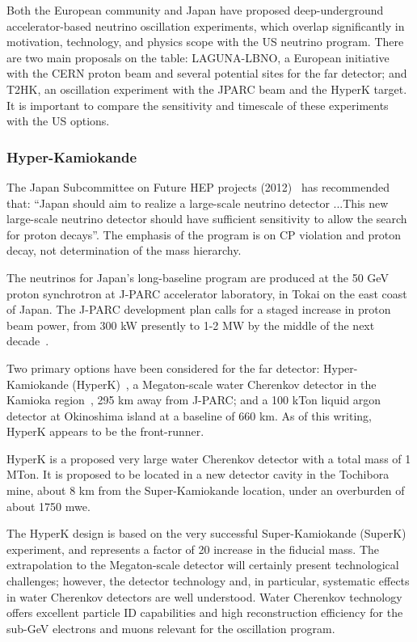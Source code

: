 Both the European community and Japan have proposed deep-underground
accelerator-based neutrino oscillation experiments, which overlap
significantly in motivation, technology, and physics scope with
the US neutrino 
program. There are two main proposals on the table: LAGUNA-LBNO,
a European initiative with the CERN proton beam and several potential
sites for the far detector; and T2HK, an oscillation experiment with
the JPARC beam and the HyperK target. It is important to compare the sensitivity and timescale of
these experiments with the US options. 

\subsubsection{Hyper-Kamiokande}

The Japan Subcommittee on Future HEP projects
(2012)~\cite{nonus:HEPfuture} has recommended 
that:
``Japan should aim to realize a large-scale neutrino detector ...This
new large-scale neutrino detector should have sufficient sensitivity
to allow the search for proton decays''. 
The emphasis of the program is on CP violation and proton decay, not
determination of the mass hierarchy.

The neutrinos for Japan's long-baseline program are produced at the
50 GeV proton synchrotron at J-PARC 
accelerator laboratory, in Tokai 
on the east coast of Japan. The J-PARC development plan calls for a
staged increase in proton beam power, from 300 kW presently to 1-2 MW
by the middle of the next decade~\cite{nonus:JapanMasterPlan}. 

Two primary options have been considered for the far detector:
Hyper-Kamiokande (HyperK)~\cite{nonus:HyperK}, a Megaton-scale water 
Cherenkov detector in the Kamioka region~\cite{nonus:HyperK}, 295 km
away from J-PARC; and a 100 kTon liquid argon detector at Okinoshima
island at a baseline of 660 km. As of this writing, HyperK appears
to be the front-runner. 

HyperK is a proposed very large water Cherenkov detector with a total
mass of 1 MTon. It is proposed to be located in a new detector cavity
in the Tochibora mine, about 8 km from the Super-Kamiokande location,
under an overburden of about 1750 mwe. 

The HyperK design is based on the very successful Super-Kamiokande
(SuperK) experiment, and represents a factor of 20 increase in the
fiducial mass. The extrapolation to the Megaton-scale detector will
certainly present technological challenges; however, the detector
technology and, in particular, systematic effects in  water
Cherenkov detectors are well understood. Water Cherenkov technology
offers excellent particle ID capabilities and high reconstruction
efficiency for the sub-GeV electrons and muons relevant for the
oscillation program. 

